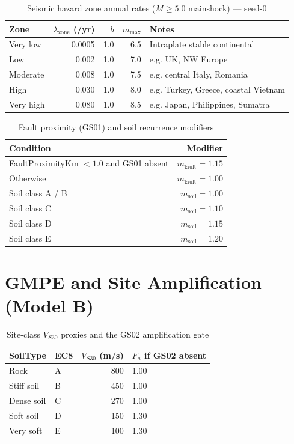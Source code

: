 \documentclass[11pt,a4paper]{article}
\begin{document}
\begin{table}[H]
  \centering
  \caption{Seismic hazard zone annual rates ($M \ge 5.0$ mainshock) --- seed-0}
  \begin{tabular}{lrrrl}
    \toprule
    \textbf{Zone} & \textbf{$\lambda_{\text{zone}}$ (/yr)} & \textbf{$b$} &
    \textbf{$m_{\max}$} & \textbf{Notes} \\
    \midrule
    Very low  & 0.0005 & 1.0 & 6.5 & Intraplate stable continental \\
    Low       & 0.002  & 1.0 & 7.0 & e.g. UK, NW Europe \\
    Moderate  & 0.008  & 1.0 & 7.5 & e.g. central Italy, Romania \\
    High      & 0.030  & 1.0 & 8.0 & e.g. Turkey, Greece, coastal Vietnam \\
    Very high & 0.080  & 1.0 & 8.5 & e.g. Japan, Philippines, Sumatra \\
    \bottomrule
  \end{tabular}
\end{table}

\begin{table}[H]
  \centering
  \caption{Fault proximity (GS01) and soil recurrence modifiers}
  \begin{tabular}{lr}
    \toprule
    \textbf{Condition} & \textbf{Modifier} \\
    \midrule
    FaultProximityKm $< 1.0$ and GS01 absent & $m_{\text{fault}} = 1.15$ \\
    Otherwise & $m_{\text{fault}} = 1.00$ \\
    Soil class A / B & $m_{\text{soil}} = 1.00$ \\
    Soil class C & $m_{\text{soil}} = 1.10$ \\
    Soil class D & $m_{\text{soil}} = 1.15$ \\
    Soil class E & $m_{\text{soil}} = 1.20$ \\
    \bottomrule
  \end{tabular}
\end{table}

\section{GMPE and Site Amplification (Model B)}\label{app:gmpe}

\begin{table}[H]
  \centering
  \caption{Site-class $V_{S30}$ proxies and the GS02 amplification gate}
  \begin{tabular}{llrl}
    \toprule
    \textbf{SoilType} & \textbf{EC8} & \textbf{$V_{S30}$ (m/s)} &
    \textbf{$F_a$ if GS02 absent} \\
    \midrule
    Rock          & A & 800 & 1.00 \\
    Stiff soil    & B & 450 & 1.00 \\
    Dense soil    & C & 270 & 1.00 \\
    Soft soil     & D & 150 & 1.30 \\
    Very soft     & E & 100 & 1.30 \\
    \bottomrule
  \end{tabular}
\end{table}
\end{document}
